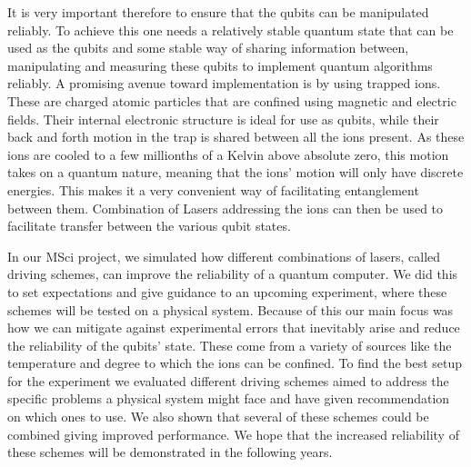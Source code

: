 {	It is very important therefore to ensure that the qubits can be manipulated reliably. To achieve this one needs a relatively stable quantum state that can be used as the qubits and some stable way of sharing information between, manipulating and measuring these qubits to implement quantum algorithms reliably. A promising avenue toward implementation is by using trapped ions. These are charged atomic particles that are confined using magnetic and electric fields. Their internal electronic structure is ideal for use as qubits, while their back and forth motion in the trap is shared between all the ions present. As these ions are cooled to a few millionths of a Kelvin above absolute zero, this motion takes on a quantum nature, meaning that the ions' motion will only have discrete energies. This makes it a very convenient way of facilitating entanglement between them. Combination of Lasers addressing the ions can then be used to facilitate transfer between the various qubit states.
	
	In our MSci project, we simulated how different combinations of lasers, called driving schemes, can improve the reliability of a quantum computer. We did this to set expectations and give guidance to an upcoming experiment, where these schemes will be tested on a physical system. Because of this our main focus was how we can mitigate against experimental errors that inevitably arise and reduce the reliability of the qubits' state. These come from a variety of sources like the temperature and degree to which the ions can be confined. To find the best setup for the experiment we evaluated different driving schemes aimed to address the specific problems a physical system might face and have given recommendation on which ones to use. We also shown that several of these schemes could be combined giving improved performance. We hope that the increased reliability of these schemes will be demonstrated in the following years.
}
\vspace*{\fill}

\newpage

\fancyhead[RE,LO]{}
